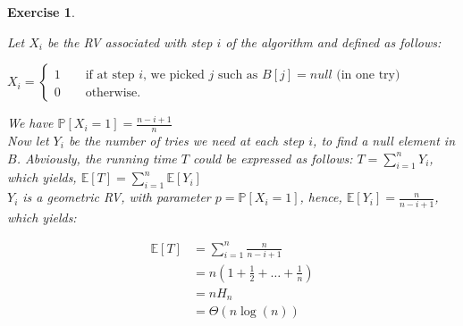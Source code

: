 \documentclass{article}
\newtheorem{exo}{Exercise}
\def\P{\mathbb{P}}
\def\E{\mathbb{E}}
\begin{document}
\begin{exo}{\ \\}

Let $X_i$ be the RV associated with step $i$ of the algorithm and defined as follows:

$X_i = 
\begin{cases}
    1 \quad \quad \text{if at step $i$, we picked $j$ such as $B[j] = null$ (in one try)} \\
    0 \quad \quad \text{otherwise.} 
\end{cases}
$

 We have $\P[X_i = 1] = \frac{n-i+1}{n}$ \\




Now let $Y_i$ be the number of tries we need at each step $i$, to find a null element in $B$. Abviously, the running time $T$ could be expressed as follows: $T = \sum^{n}_{i=1} Y_i$, which yields, $\E[T] = \sum^{n}_{i=1} \E[Y_i]$ \\

$Y_i$ is a geometric RV, with parameter $p = \P[X_i = 1]$, hence, $\E[Y_i] = \frac{n}{n-i+1} $, which yields:

\begin{align*}
    \E[T] 
    &= \sum^{n}_{i=1} \frac{n}{n-i+1} \\
    &= n(1+ \frac{1}{2} + \dots + \frac{1}{n} ) \\
    &= n H_n \\
    &= \Theta(n\log(n))
\end{align*}






\end{exo}
\end{document}

